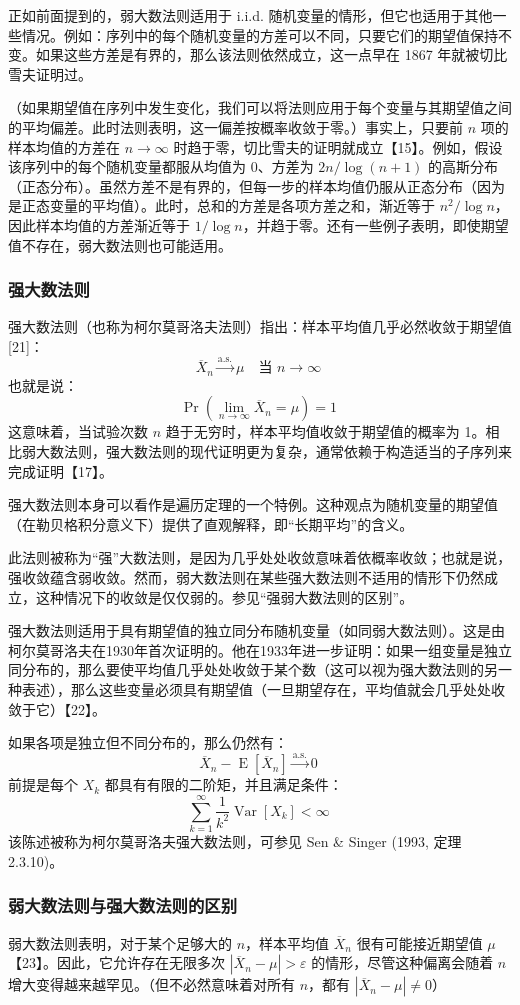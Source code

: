 正如前面提到的，弱大数法则适用于 i.i.d. 随机变量的情形，但它也适用于其他一些情况。例如：序列中的每个随机变量的方差可以不同，只要它们的期望值保持不变。如果这些方差是有界的，那么该法则依然成立，这一点早在 1867 年就被切比雪夫证明过。

（如果期望值在序列中发生变化，我们可以将法则应用于每个变量与其期望值之间的平均偏差。此时法则表明，这一偏差按概率收敛于零。）事实上，只要前 $n$ 项的样本均值的方差在 $n \to \infty$ 时趋于零，切比雪夫的证明就成立【15】。例如，假设该序列中的每个随机变量都服从均值为 0、方差为 $2n/\log(n+1)$ 的高斯分布（正态分布）。虽然方差不是有界的，但每一步的样本均值仍服从正态分布（因为是正态变量的平均值）。此时，总和的方差是各项方差之和，渐近等于 $n^2 / \log n$，因此样本均值的方差渐近等于 $1 / \log n$，并趋于零。还有一些例子表明，即使期望值不存在，弱大数法则也可能适用。
\subsubsection{强大数法则}
强大数法则（也称为柯尔莫哥洛夫法则）指出：样本平均值几乎必然收敛于期望值[21]：
$$
\overline{X}_n \xrightarrow{\text{a.s.}} \mu \quad \text{当 } n \to \infty~
$$
也就是说：
$$
\Pr\left(\lim_{n \to \infty} \overline{X}_n = \mu\right) = 1~
$$
这意味着，当试验次数 $n$ 趋于无穷时，样本平均值收敛于期望值的概率为 1。相比弱大数法则，强大数法则的现代证明更为复杂，通常依赖于构造适当的子序列来完成证明【17】。

强大数法则本身可以看作是遍历定理的一个特例。这种观点为随机变量的期望值（在勒贝格积分意义下）提供了直观解释，即“长期平均”的含义。

此法则被称为“强”大数法则，是因为几乎处处收敛意味着依概率收敛；也就是说，强收敛蕴含弱收敛。然而，弱大数法则在某些强大数法则不适用的情形下仍然成立，这种情况下的收敛是仅仅弱的。参见“强弱大数法则的区别”。

强大数法则适用于具有期望值的独立同分布随机变量（如同弱大数法则）。这是由柯尔莫哥洛夫在1930年首次证明的。他在1933年进一步证明：如果一组变量是独立同分布的，那么要使平均值几乎处处收敛于某个数（这可以视为强大数法则的另一种表述），那么这些变量必须具有期望值（一旦期望存在，平均值就会几乎处处收敛于它）【22】。

如果各项是独立但不同分布的，那么仍然有：
$$
\overline{X}_n - \operatorname{E}[\overline{X}_n] \xrightarrow{\text{a.s.}} 0~
$$
前提是每个 $X_k$ 都具有有限的二阶矩，并且满足条件：
$$
\sum_{k=1}^{\infty} \frac{1}{k^2} \operatorname{Var}[X_k] < \infty~
$$
该陈述被称为柯尔莫哥洛夫强大数法则，可参见 Sen & Singer (1993, 定理 2.3.10)。
\subsubsection{弱大数法则与强大数法则的区别}
弱大数法则表明，对于某个足够大的 $n$，样本平均值 $\overline{X}_n$ 很有可能接近期望值 $\mu$【23】。因此，它允许存在无限多次 $|\overline{X}_n - \mu| > \varepsilon$ 的情形，尽管这种偏离会随着 $n$ 增大变得越来越罕见。（但不必然意味着对所有 $n$，都有 $|\overline{X}_n - \mu| \ne 0$）

